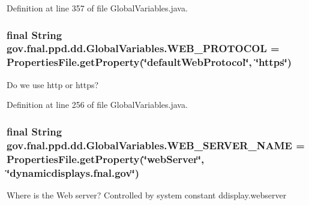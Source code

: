 Definition at line 357 of file Global\-Variables.\-java.

\hypertarget{classgov_1_1fnal_1_1ppd_1_1dd_1_1GlobalVariables_aa3bf05d555f0c3489c60664ae54a2480}{
\subsubsection[{W\-E\-B\-\_\-\-P\-R\-O\-T\-O\-C\-O\-L}]{\setlength{\rightskip}{0pt plus 5cm}final String gov.\-fnal.\-ppd.\-dd.\-Global\-Variables.\-W\-E\-B\-\_\-\-P\-R\-O\-T\-O\-C\-O\-L = {\bf Properties\-File.\-get\-Property}(\char`\"{}default\-Web\-Protocol\char`\"{}, \char`\"{}https\char`\"{})\hspace{0.3cm}{\ttfamily [static]}}}\label{classgov_1_1fnal_1_1ppd_1_1dd_1_1GlobalVariables_aa3bf05d555f0c3489c60664ae54a2480}
Do we use http or https? 

Definition at line 256 of file Global\-Variables.\-java.

\hypertarget{classgov_1_1fnal_1_1ppd_1_1dd_1_1GlobalVariables_af5ffb15826513fabba402ec017edbc70}{
\subsubsection[{W\-E\-B\-\_\-\-S\-E\-R\-V\-E\-R\-\_\-\-N\-A\-M\-E}]{\setlength{\rightskip}{0pt plus 5cm}final String gov.\-fnal.\-ppd.\-dd.\-Global\-Variables.\-W\-E\-B\-\_\-\-S\-E\-R\-V\-E\-R\-\_\-\-N\-A\-M\-E = {\bf Properties\-File.\-get\-Property}(\char`\"{}web\-Server\char`\"{}, \char`\"{}dynamicdisplays.\-fnal.\-gov\char`\"{})\hspace{0.3cm}{\ttfamily [static]}}}\label{classgov_1_1fnal_1_1ppd_1_1dd_1_1GlobalVariables_af5ffb15826513fabba402ec017edbc70}
Where is the Web server? Controlled by system constant ddisplay.\-webserver 

